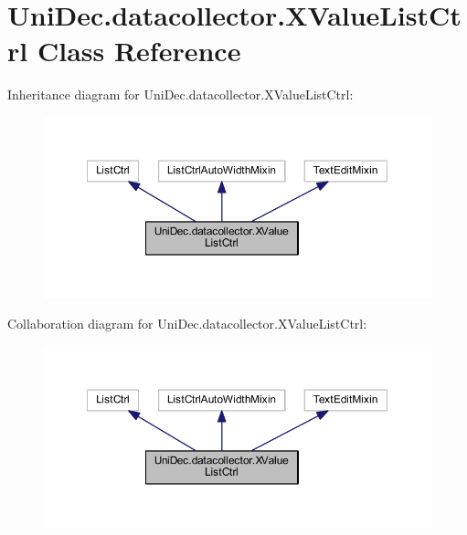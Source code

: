 \hypertarget{class_uni_dec_1_1datacollector_1_1_x_value_list_ctrl}{}\section{Uni\+Dec.\+datacollector.\+X\+Value\+List\+Ctrl Class Reference}
\label{class_uni_dec_1_1datacollector_1_1_x_value_list_ctrl}


Inheritance diagram for Uni\+Dec.\+datacollector.\+X\+Value\+List\+Ctrl\+:\nopagebreak
\begin{figure}[H]
\begin{center}
\leavevmode
\includegraphics[width=350pt]{class_uni_dec_1_1datacollector_1_1_x_value_list_ctrl__inherit__graph}
\end{center}
\end{figure}


Collaboration diagram for Uni\+Dec.\+datacollector.\+X\+Value\+List\+Ctrl\+:\nopagebreak
\begin{figure}[H]
\begin{center}
\leavevmode
\includegraphics[width=350pt]{class_uni_dec_1_1datacollector_1_1_x_value_list_ctrl__coll__graph}
\end{center}
\end{figure}
